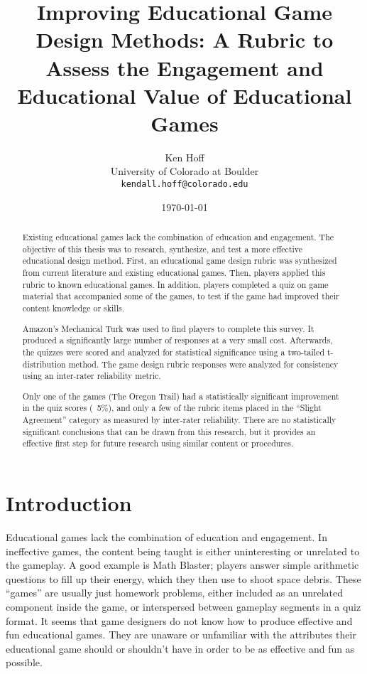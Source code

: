\documentclass[12pt]{report}
\author{Ken Hoff \\ University of Colorado at Boulder \\ \texttt{kendall.hoff@colorado.edu} 
}
\date{\today}
\title{Improving Educational Game Design Methods: A Rubric to Assess the Engagement and Educational Value of Educational Games
}
\begin{document}
\maketitle

\begin{abstract}

Existing educational games lack the combination of education and engagement. The objective of this thesis was to research, synthesize, and test a more effective educational design method. First, an educational game design rubric was synthesized from current literature and existing educational games. Then, players applied this rubric to known educational games. In addition, players completed a quiz on game material that accompanied some of the games, to test if the game had improved their content knowledge or skills.

Amazon's Mechanical Turk was used to find players to complete this survey. It produced a significantly large number of responses at a very small cost. Afterwards, the quizzes were scored and analyzed for statistical significance using a two-tailed t-distribution method. The game design rubric responses were analyzed for consistency using an inter-rater reliability metric.

Only one of the games (The Oregon Trail) had a statistically significant improvement in the quiz scores (~5\%), and only a few of the rubric items placed in the ``Slight Agreement'' category as measured by inter-rater reliability. There are no statistically significant conclusions that can be drawn from this research, but it provides an effective first step for future research using similar content or procedures.

\end{abstract}

\tableofcontents
\listoffigures

\chapter{Introduction}
	Educational games lack the combination of education and engagement. In ineffective games, the content being taught is either uninteresting or unrelated to the gameplay. A good example is Math Blaster; players answer simple arithmetic questions to fill up their energy, which they then use to shoot space debris. These “games” are usually just homework problems, either included as an unrelated component inside the game, or interspersed between gameplay segments in a quiz format. It seems that game designers do not know how to produce effective and fun educational games. They are unaware or unfamiliar with the attributes their educational game should or shouldn't have in order to be as effective and fun as possible.
\end{document}
